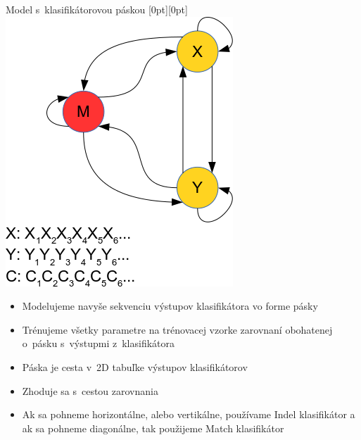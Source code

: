 \documentclass[xcolor=dvipsnames, compress, 12pt]{beamer}
\newcommand{\lenitem}[2][.6\linewidth]{\parbox[t]{#1}{\strut #2\strut}}
\theoremstyle{definition}
\begin{document}


\begin{frame}{Model s~klasifikátorovou páskou}
  \mbox{}\hfill\raisebox{-\height}[0pt][0pt]{
   \includegraphics[width=.30\textwidth]{images/model_clf_paska}
   }
  \vspace*{-\baselineskip}

  \begin{itemize}
      \item \lenitem{Modelujeme navyše sekvenciu výstupov klasifikátora vo forme pásky}
      \item \lenitem{Trénujeme všetky parametre na trénovacej vzorke zarovnaní obohatenej o~pásku s~výstupmi z~klasifikátora}
  \end{itemize}

  \begin{itemize}
    \item \lenitem{Páska je cesta v~2D tabuľke výstupov klasifikátorov}
    \item \lenitem{Zhoduje sa s~cestou zarovnania}
    \item Ak sa pohneme horizontálne, alebo vertikálne, používame Indel klasifikátor a ak sa pohneme diagonálne, tak použijeme Match klasifikátor
  \end{itemize}
\end{frame}

\end{document}
